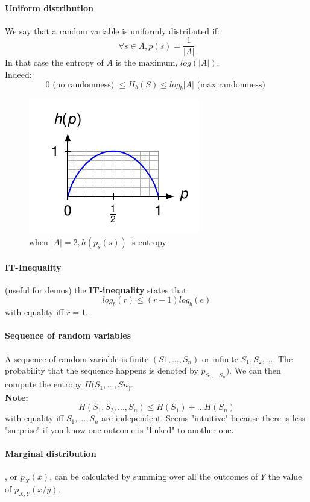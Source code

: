 \documentclass{article}
\begin{document}
\paragraph{Uniform distribution} We say that a random variable is uniformly distributed if:
\[ \forall s \in A, p(s) = \frac{1}{|A|}\]
In that case the entropy of $ A $ is the maximum, $ log(|A|) $.\\
Indeed:
\[ 0 \text{ (no randomness) } \leq H_b(S) \leq log_b|A| \text{ (max randomness) } \]

\begin{figure}
    \centering
    \includegraphics[width=0.4\linewidth]{entropy.png}
    \caption{when $|A| = 2, h(p_s(s)) $ is entropy}
    \label{fig:enter-label}
\end{figure}

\paragraph{IT-Inequality} (useful for demos) the \textbf{IT-inequality} states that:
\[ log_b(r) \leq (r-1)log_b(e) \]
with equality iff $ r = 1 $.

\paragraph{Sequence of random variables} A sequence of random variable is finite $ (S1,...,S_n) $ or infinite $ S_1, S_2, ... $. The probability that the sequence happens is denoted by $ p_{S_1,...S_n}) $. We can then compute the entropy $ H(S_1,...,Sn_) $.\\
\textbf{Note:}
\[ H(S_1,S_2,...,S_n) \leq H(S_1) + ... H(S_n) \]
with equality iff $ S_1,...,S_n $ are independent. Seems "intuitive" because there is less "surprise" if you know one outcome is "linked" to another one.

\paragraph{Marginal distribution}, or $ p_X(x) $, can be calculated by summing over all the outcomes of $ Y $ the value of $ p_{X,Y}(x/y) $.
\end{document}
